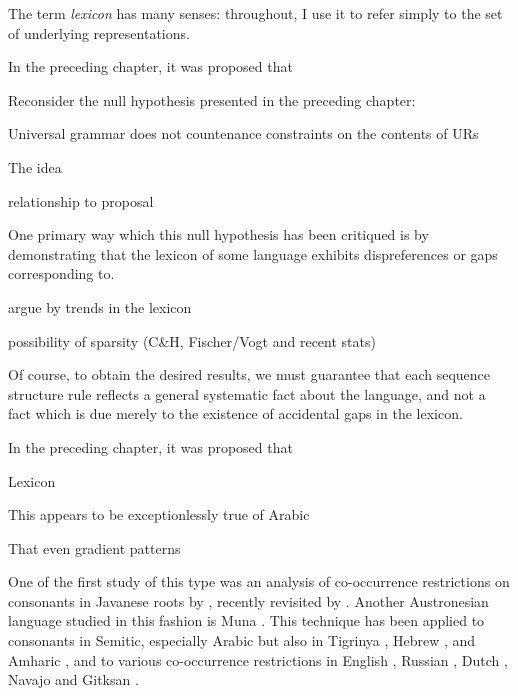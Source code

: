\label{clusters}

The term \emph{lexicon} has many senses: throughout, I use it to refer simply to the set of underlying representations.

In the preceding chapter, it was proposed that 

Reconsider the null hypothesis presented in the preceding chapter:

\begin{example}
Universal grammar does not countenance constraints on the contents of URs
\end{example}

The idea 

relationship to proposal

One primary way which this null hypothesis has been critiqued is by demonstrating that the lexicon of some language 
exhibits dispreferences or gaps corresponding to.

argue by trends in the lexicon

possibility of sparsity (C\&H, Fischer/Vogt and recent stats)

Of course, to obtain the desired results, we must guarantee that each sequence structure rule reflects a general systematic fact about the language, and not a fact which is due merely to the existence of accidental gaps in the lexicon. \citep[][401, fn.~8]{Stanley1967}

In the preceding chapter, it was proposed that 

Lexicon

This appears to be exceptionlessly true of Arabic

That even gradient patterns 

One of the first study of this type was an analysis of co-occurrence restrictions on consonants in Javanese roots by \citet{Mester1988}, recently revisited by \citet{Graff2011}. 
Another Austronesian language studied in this fashion is Muna \citep{Coetzee2008a,Anttila2008}.
This technique has been applied to consonants in Semitic, especially Arabic \citep{McCarthy1988,McCarthy1994,Pierrehumbert1993,Frisch1996,Frisch2004,Coetzee2008a} but also in Tigrinya \citep{Buckley1997}, Hebrew \citep{Berent2003}, and Amharic \citep{Colavin2010}, and to various co-occurrence restrictions in English \citep{Berkley1994b,Berkley1994a,Pierrehumbert1994,Dmitrieva2008a,Dmitrieva2008b,Coetzee2008b}, Russian \citep{Padgett1992}, Dutch \citep{Graff2011}, Navajo \citep{Martin2007,Martin2011} and Gitksan \citep{Brown2010}.

